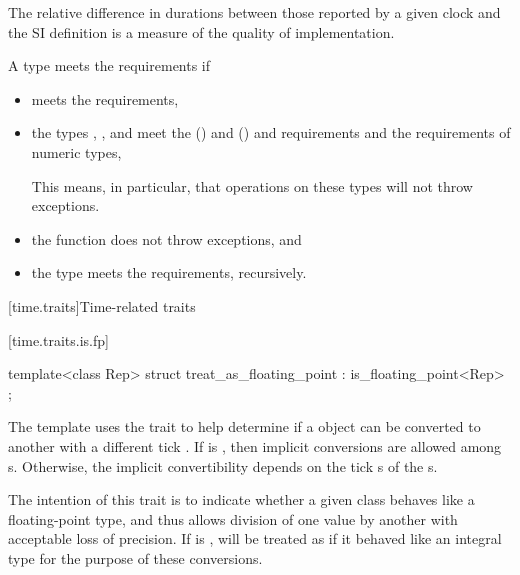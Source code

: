 \pnum
\begin{note}
The relative difference in durations between those reported by a given clock and the
SI definition is a measure of the quality of implementation.
\end{note}

\pnum
A type  meets the  requirements if
\begin{itemize}
\item
{} meets the  requirements,

\item
the types , , and 
meet the  () and
 ()
and 
requirements and the requirements of
numeric types,
\begin{note}
This means, in particular,
that operations on these types will not throw exceptions.
\end{note}
\item
the function  does not throw exceptions, and
\item
the type  meets the 
requirements, recursively.
\end{itemize}

[time.traits]{Time-related traits}

[time.traits.is.fp]{}

%
\begin{itemdecl}
template<class Rep> struct treat_as_floating_point : is_floating_point<Rep> { };
\end{itemdecl}

\pnum
The  template uses the  trait to
help determine if a  object can be converted to another
 with a different tick . If
 is , then implicit conversions
are allowed among s. Otherwise, the implicit convertibility
depends on the tick s of the s.
\begin{note}
The intention of this trait is to indicate whether a given class behaves like a floating-point
type, and thus allows division of one value by another with acceptable loss of precision. If
 is ,  will be treated as
if it behaved like an integral type for the purpose of these conversions.
\end{note}

